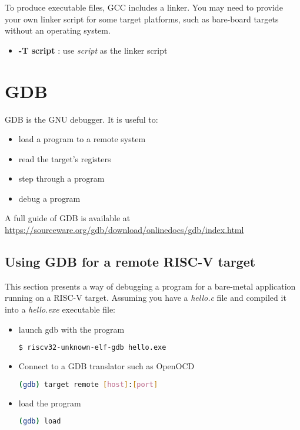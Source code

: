 \documentclass{article}
\begin{document}
    To produce executable files, GCC includes a linker. You may need to provide your own linker script for some target platforms, such as bare-board targets without an operating system.
    
    \vspace{-\topsep}
	\begin{itemize}
	\item \textbf{-T script} : use \textit{script} as the linker script
	\end{itemize}
    
    \newpage
    \section{GDB}
    
    GDB is the GNU debugger. It is useful to:
    
    \vspace{-\topsep}
	\begin{itemize}
	\item load a program to a remote system
	\item read the target's registers
	\item step through a program
	\item debug a program
	\end{itemize}
	
	A full guide of GDB is available at \url{https://sourceware.org/gdb/download/onlinedocs/gdb/index.html}
	
	\subsection{Using GDB for a remote RISC-V target}
	
	This section presents a way of debugging a program for a bare-metal application running on a RISC-V target. Assuming you have a \textit{hello.c} file and compiled it into a \textit{hello.exe} executable file:
	
	\vspace{-\topsep}
	\begin{itemize}
	\item launch gdb with the program
	
	\begin{lstlisting}[language=bash]
    $ riscv32-unknown-elf-gdb hello.exe
    \end{lstlisting}
    
    \item Connect to a GDB translator such as OpenOCD
    
    \begin{lstlisting}[language=bash]
    (gdb) target remote [host]:[port]
    \end{lstlisting}
    
    \item load the program
    
    \begin{lstlisting}[language=bash]
    (gdb) load
    \end{lstlisting}
	\end{itemize}
	
\end{document}
